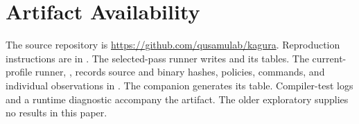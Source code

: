 \documentclass[conference]{IEEEtran}
\begin{document}
\section*{Artifact Availability}

The source repository is \url{https://github.com/qusamulab/kagura}.
Reproduction instructions are in .
The selected-pass runner writes  and its tables.
The current-profile runner, , records source and
binary hashes, policies, commands, and individual observations in
. The companion
 generates its table. Compiler-test logs
and a runtime diagnostic accompany the artifact. The older exploratory
 supplies no results in this paper.


\newpage

\end{document}
